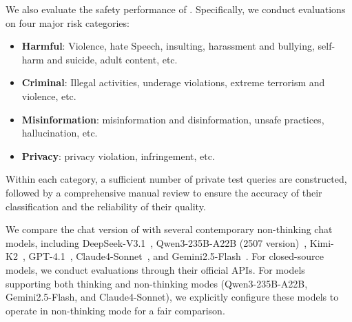 \begin{itemize}
\end{itemize}

We also evaluate the safety performance of \longcat. Specifically, we conduct evaluations on four major risk categories:
\begin{itemize}
    \item \textbf{Harmful}: Violence, hate Speech, insulting, harassment and bullying, self-harm and suicide, adult content, etc. 
    \item \textbf{Criminal}: Illegal activities, underage violations, extreme terrorism and violence, etc. 
    \item \textbf{Misinformation}: misinformation and disinformation, unsafe practices, hallucination, etc. 
    \item \textbf{Privacy}: privacy violation, infringement, etc.
\end{itemize}

Within each category, a sufficient number of private test queries are constructed, followed by a comprehensive manual review to ensure the accuracy of their classification and the reliability of their quality.

We compare the chat version of \longcat with several contemporary non-thinking chat models, including DeepSeek-V3.1~\citep{deepseekai2025deepseekv3technicalreport}, Qwen3-235B-A22B (2507 version)~\citep{yang2025qwen3}, Kimi-K2~\citep{Kimi_K2_web_doc}, GPT-4.1~\citep{gpt4.1}, Claude4-Sonnet~\citep{claude4}, and Gemini2.5-Flash~\citep{comanici2025gemini}. For closed-source models, we conduct evaluations through their official APIs. For models supporting both thinking and non-thinking modes (Qwen3-235B-A22B, Gemini2.5-Flash, and Claude4-Sonnet), we explicitly configure these models to operate in non-thinking mode for a fair comparison.


